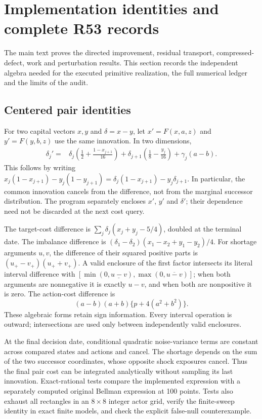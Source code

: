 \section{Implementation identities and complete R53 records}\label{supp:technical53}
The main text proves the directed improvement, residual transport, compressed-defect, work and perturbation results. This section records the independent algebra needed for the executed primitive realization, the full numerical ledger and the limits of the audit.

\subsection{Centered pair identities}
For two capital vectors $x,y$ and $\delta=x-y$, let $x'=F(x,a,z)$ and $y'=F(y,b,z)$ use the same innovation. In two dimensions,
\begin{align}\label{eq:deltaimpl53}
 \delta_j'={}&\delta_j\left(\frac12+\frac{1-x_{j+1}}{16}\right)
 +\delta_{j+1}\left(\frac18-\frac{y_j}{16}\right)
 +\gamma_j(a-b).
\end{align}
This follows by writing $x_j(1-x_{j+1})-y_j(1-y_{j+1})=
\delta_j(1-x_{j+1})-y_j\delta_{j+1}$. In particular, the common innovation cancels from the difference, not from the marginal successor distribution. The program separately encloses $x'$, $y'$ and $\delta'$; their dependence need not be discarded at the next cost query.

The target-cost difference is $\sum_j\delta_j(x_j+y_j-5/4)$, doubled at the terminal date. The imbalance difference is
$(\delta_1-\delta_2)(x_1-x_2+y_1-y_2)/4$. For shortage arguments $u,v$, the difference of their squared positive parts is
$(u_+-v_+)(u_++v_+)$. A valid enclosure of the first factor intersects its literal interval difference with
$[\min(0,\underline{u-v}),\max(0,\overline{u-v})]$; when both arguments are nonnegative it is exactly $u-v$, and when both are nonpositive it is zero. The action-cost difference is
\[
 (a-b)(a+b)\{p+4(a^2+b^2)\}.
\]
These algebraic forms retain sign information. Every interval operation is outward; intersections are used only between independently valid enclosures.

At the final decision date, conditional quadratic noise-variance terms are constant across compared states and actions and cancel. The shortage depends on the sum of the two successor coordinates, whose opposite shock exposures cancel. Thus the final pair cost can be integrated analytically without sampling its last innovation. Exact-rational tests compare the implemented expression with a separately computed original Bellman expression at 100 points. Tests also exhaust all rectangles in an $8\times8$ integer actor grid, verify the finite-sweep identity in exact finite models, and check the explicit false-null counterexample.

